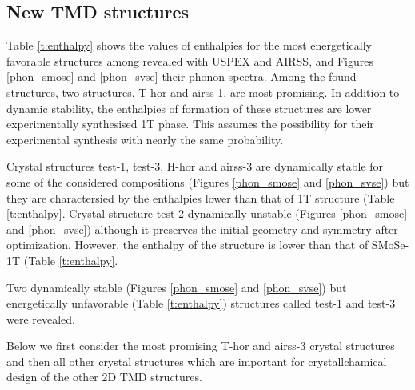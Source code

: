 \documentclass[a4paperm]{article}
\begin{document}
		\subsection{New TMD structures}

Table \ref{t:enthalpy} shows the values of enthalpies for the most energetically favorable structures among revealed with USPEX and AIRSS, and Figures \ref{phon_smose} and  \ref{phon_svse} their phonon spectra. 
Among the found structures, two structures, T-hor and airss-1, are most promising.
In addition to dynamic stability, the enthalpies of formation of these structures are lower experimentally synthesised 1T phase.
This assumes the possibility for their experimental synthesis with nearly the same probability.

Crystal structures test-1, test-3, H-hor and airss-3 are dynamically stable for some of the considered compositions (Figures \ref{phon_smose} and  \ref{phon_svse}) but they are charactersied by the enthalpies lower than that of 1T structure (Table \ref{t:enthalpy}. 
Crystal structure test-2 dynamically unstable (Figures \ref{phon_smose} and \ref{phon_svse}) although it preserves the initial geometry and symmetry after optimization.
However, the enthalpy of the structure is lower than that of SMoSe-1T  (Table \ref{t:enthalpy}.

Two dynamically stable (Figures \ref{phon_smose} and  \ref{phon_svse}) but energetically unfavorable (Table \ref{t:enthalpy}) structures called test-1 and test-3 were revealed.

Below we first consider the most promising T-hor and airss-3 crystal structures and then all other crystal structures which are important for crystallchamical design of the other 2D TMD structures.
\end{document}
